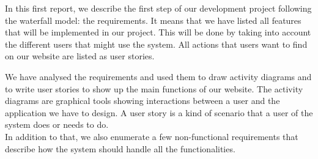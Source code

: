 

In this first report, we describe the first step of our development project following the waterfall model: the requirements. It means that we have listed all features that will be implemented in our project. This will be done by taking into account the different users that might use the system. All actions that users want to find on our website are listed as user stories.

We have analysed the requirements and used them to draw activity diagrams and to write user stories to show up the main functions of our website. The activity diagrams are graphical tools showing interactions between a user and the application we have to design. A user story is a kind of scenario that a user of the system does or needs to do.\\

In addition to that, we also enumerate a few non-functional requirements that describe how the system should handle all the functionalities.